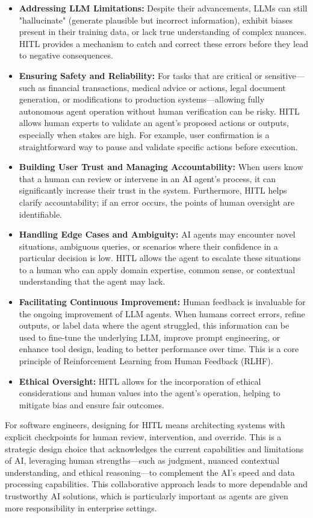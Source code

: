 \begin{itemize}
    \item \textbf{Addressing LLM Limitations:} Despite their advancements, LLMs can still "hallucinate" (generate plausible but incorrect information), 
    exhibit biases present in their training data, or lack true understanding of complex nuances. HITL provides a mechanism to catch and correct 
    these errors before they lead to negative consequences.
    \item \textbf{Ensuring Safety and Reliability:} For tasks that are critical or sensitive—such as financial transactions, medical advice or 
    actions, legal document generation, or modifications to production systems—allowing fully autonomous agent operation without human verification 
    can be risky. HITL allows human experts to validate an agent's proposed actions or outputs, especially when stakes are high. 
    For example, user confirmation is a straightforward way to pause and validate specific actions before execution.
    \item \textbf{Building User Trust and Managing Accountability:} When users know that a human can review or intervene in an 
    AI agent's process, it can significantly increase their trust in the system. Furthermore, HITL helps clarify accountability; 
    if an error occurs, the points of human oversight are identifiable.
    \item \textbf{Handling Edge Cases and Ambiguity:} AI agents may encounter novel situations, ambiguous queries, or scenarios
     where their confidence in a particular decision is low. HITL allows the agent to escalate these situations to a 
     human who can apply domain expertise, common sense, or contextual understanding that the agent may lack.
    \item \textbf{Facilitating Continuous Improvement:} Human feedback is invaluable for the ongoing improvement of LLM agents.
     When humans correct errors, refine outputs, or label data where the agent struggled, this information can be used to 
     fine-tune the underlying LLM, improve prompt engineering, or enhance tool design, leading to better performance over time. 
     This is a core principle of Reinforcement Learning from Human Feedback (RLHF).
    \item \textbf{Ethical Oversight:} HITL allows for the incorporation of ethical considerations and human values into the agent's operation, 
    helping to mitigate bias and ensure fair outcomes.
\end{itemize}
For software engineers, designing for HITL means architecting systems with explicit checkpoints for human review, intervention, and override. 
This is a strategic design choice that acknowledges the current capabilities and limitations of AI, leveraging human strengths—such as judgment, 
nuanced contextual understanding, and ethical reasoning—to complement the AI's speed and data processing capabilities. 
This collaborative approach leads to more dependable and trustworthy AI solutions, which is particularly important as agents are 
given more responsibility in enterprise settings.

